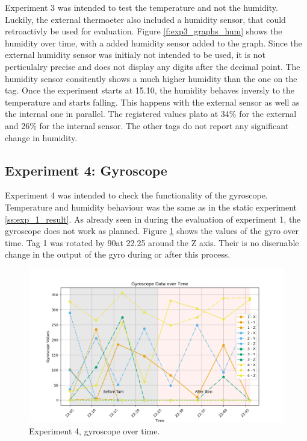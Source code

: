 Experiment 3 was intended to test the temperature and not the humidity.
Luckily, the external thermoeter also included a humidity sensor, that could retroactivly be used for evaluation.
Figure \ref{f:exp3_graphs_hum} shows the humidity over time, with a added humidity sensor added to the graph.
Since the external humidity sensor was initialy not intended to be used, it is not perticulalry precise and does not display any digits after the decimal point.
The humidity sensor consitently shows a much higher humidity than the one on the tag.
Once the experiment starts at 15.10, the humidity behaves inversly to the temperature and starts falling.
This happens with the external sensor as well as the internal one in parallel.
The registered values plato at 34\% for the external and 26\% for the internal sensor.
The other tags do not report any significant change in humidity.

\subsection{Experiment 4: Gyroscope}
\label{ss:exp_4_result}

Experiment 4 was intended to check the functionality of the gyroscope.
Temperature and humidity behaviour was the same as in the static experiment \ref{ss:exp_1_result}.
As already seen in during the evaluation of experiment 1, the gyroscope does not work as planned.
Figure \ref{f:exp4_graphs_gyro} shows the values of the gyro over time.
Tag 1 was rotated by 90\degree  at 22.25 around the Z axis.
Their is no disernable change in the output of the gyro during or after this process.

\begin{figure}[ht!]
	\includegraphics[width=\linewidth]{graphics/exp/exp4_gyro_data_plot_1.png}
	\caption{Experiment 4, gyroscope over time.}
	\label{f:exp4_graphs_gyro}
\end{figure}


